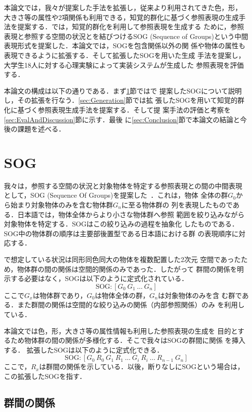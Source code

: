 \documentclass[japanese]{jnlp_1.2}
\begin{document}
本論文では，我々が提案した手法を拡張し，従来より利用されてきた色，形，
大きさ等の属性や2項関係も利用できる，知覚的群化に基づく参照表現の生成手
法を提案する．\cite{KF2006}では，知覚的群化を利用して参照表現を生成する
ために，参照表現と参照する空間の状況とを結びつけるSOG (Sequence of
Groups)という中間表現形式を提案した．本論文では，SOGを包含関係以外の関
係や物体の属性も表現できるように拡張する．そして拡張したSOGを用いた生成
手法を提案し，大学生18人に対する心理実験によって実装システムが生成した
参照表現を評価する．

本論文の構成は以下の通りである．まず\ref{sec:SOG}節では\cite{KF2006}で
提案したSOGについて説明し，その拡張を行なう．\ref{sec:Generation}節では拡
張したSOGを用いて知覚的群化に基づく参照表現生成手法を提案する．そして提
案手法の評価と考察を\ref{sec:EvalAndDiscussion}節に示す．最後
に\ref{sec:Conclusion}節で本論文の結論と今後の課題を述べる．


\section{SOG}\label{sec:SOG}

我々は，参照する空間の状況と対象物体を特定する参照表現との間の中間表現
として，SOG (Sequence Of Groups)を提案した~\cite{KF2006}．これは，物体
全体の群$G_{0}$から始まり対象物体のみを含む物体群$G_{n}$に至る物体群の
列を表現したものである．日本語では，物体全体からより小さな物体群へ参照
範囲を絞り込みながら対象物体を特定する．SOGはこの絞り込みの過程を抽象化
したものである．SOG中の物体群の順序は主要部後置型である日本語における群
の表現順序に対応する．

\cite{KF2006}で想定している状況は同形同色同大の物体を複数配置した2次元
空間であったため，物体群の間の関係は空間的関係のみであった．したがって
群間の関係を明示する必要はなく，SOGは以下のように定式化されている．
\[
  \mbox{SOG}: [G_{0}\ G_1\ \dots\ G_{n}]
\]
ここで$G_x$は物体群であり，$G_0$は物体全体の群，$G_n$は対象物体のみを含
む群である．また群間の関係は空間的な絞り込みの関係（内部参照関係）のみ
を利用している．

本論文では色，形，大きさ等の属性情報も利用した参照表現の生成を
目的とするため物体群の間の関係が多様化する．そこで我々はSOGの群間に関係
を挿入する．
拡張したSOGは以下のように定式化できる．
\[
 \mbox{SOG}: [G_{0}\ R_{0}\ G_1\ R_1\ \dots\ G_{i}\ R_{i}\ \dots\ R_{n-1}\ G_{n}]
\]
ここで，$R_x$は群間の関係を示している．以後，断りなしにSOGという場合は，
この拡張したSOGを指す．


\subsection{群間の関係}
\end{document}
